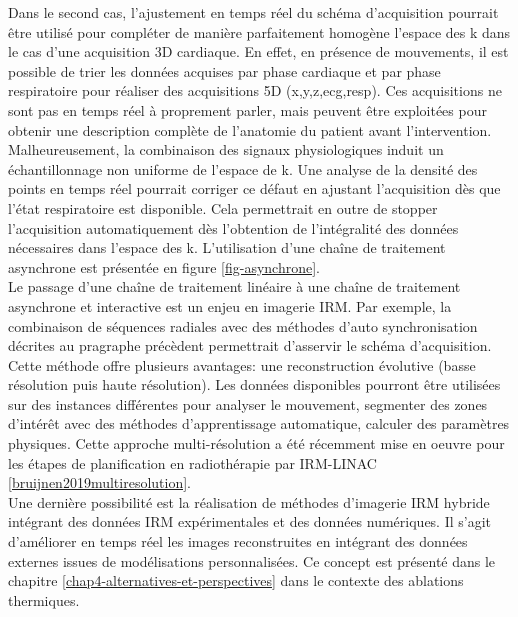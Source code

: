 \documentclass[10pt,a4paper]{report}
\begin{document}

Dans le second cas, l’ajustement en temps réel du schéma d’acquisition pourrait être utilisé pour compléter de manière parfaitement homogène l’espace des k dans le cas d’une acquisition 3D cardiaque. En effet, en présence de mouvements, il est possible de trier les données acquises par phase cardiaque et par phase respiratoire pour réaliser des acquisitions 5D (x,y,z,ecg,resp). Ces acquisitions ne sont pas en temps réel à proprement parler, mais peuvent être exploitées pour obtenir une description complète de l’anatomie du patient avant l’intervention. Malheureusement, la combinaison des signaux physiologiques induit un échantillonnage non uniforme de l’espace de k. Une analyse de la densité des points en temps réel pourrait corriger ce défaut en ajustant l’acquisition dès que l’état respiratoire est disponible. Cela permettrait en outre de stopper l’acquisition automatiquement dès l’obtention de l’intégralité des données nécessaires dans l’espace des k. L’utilisation d’une chaîne de traitement asynchrone est présentée en figure \ref{fig-asynchrone}.\\

Le passage d’une chaîne de traitement linéaire à une chaîne de traitement asynchrone et interactive est un enjeu en imagerie IRM. Par exemple, la combinaison de séquences radiales avec des méthodes d’auto synchronisation décrites au pragraphe précèdent permettrait d’asservir le schéma d’acquisition. Cette méthode offre plusieurs avantages: une reconstruction évolutive (basse résolution puis haute résolution). Les données disponibles pourront être utilisées sur des instances différentes pour analyser le mouvement, segmenter des zones d’intérêt avec des méthodes d’apprentissage automatique, calculer des paramètres physiques. Cette approche multi-résolution a été récemment mise en oeuvre pour les étapes de planification en radiothérapie par IRM-\ac{LINAC} \ref{bruijnen2019multiresolution}.\\

Une dernière possibilité est la réalisation de méthodes d'imagerie IRM hybride intégrant des données IRM expérimentales et des données numériques. Il s'agit d'améliorer en temps réel les images reconstruites en intégrant des données externes issues de modélisations personnalisées. Ce concept est présenté dans le chapitre \ref{chap4-alternatives-et-perspectives} dans le contexte des ablations thermiques.\\
\end{document}
